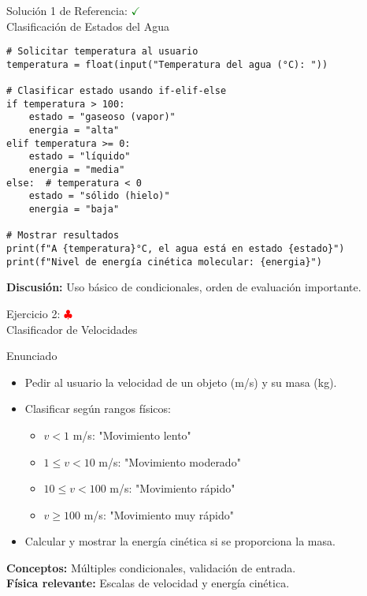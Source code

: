 \documentclass[10pt]{beamer}
\begin{document}
\begin{frame}[fragile]{Solución 1 de Referencia: \hfill \textcolor{green}{$\checkmark$} \\ Clasificación de Estados del Agua}
\begin{verbatim}
# Solicitar temperatura al usuario
temperatura = float(input("Temperatura del agua (°C): "))

# Clasificar estado usando if-elif-else
if temperatura > 100:
    estado = "gaseoso (vapor)"
    energia = "alta"
elif temperatura >= 0:
    estado = "líquido"
    energia = "media"
else:  # temperatura < 0
    estado = "sólido (hielo)"
    energia = "baja"

# Mostrar resultados
print(f"A {temperatura}°C, el agua está en estado {estado}")
print(f"Nivel de energía cinética molecular: {energia}")
\end{verbatim}
\textbf{Discusión:} Uso básico de condicionales, orden de evaluación importante.
\end{frame}

\begin{frame}{Ejercicio 2: \hfill \textcolor{red}{$\clubsuit$} \\ Clasificador de Velocidades}
  \begin{block}{Enunciado}
    \begin{itemize}
      \item Pedir al usuario la velocidad de un objeto (m/s) y su masa (kg).
      \item Clasificar según rangos físicos:
        \begin{itemize}
          \item $v < 1$ m/s: "Movimiento lento"
          \item $1 \leq v < 10$ m/s: "Movimiento moderado"
          \item $10 \leq v < 100$ m/s: "Movimiento rápido"
          \item $v \geq 100$ m/s: "Movimiento muy rápido"
        \end{itemize}
      \item Calcular y mostrar la energía cinética si se proporciona la masa.
    \end{itemize}
  \end{block}
  
  \textbf{Conceptos:} Múltiples condicionales, validación de entrada.
  \\
  \textbf{Física relevante:} Escalas de velocidad y energía cinética.
\end{frame}
\end{document}
